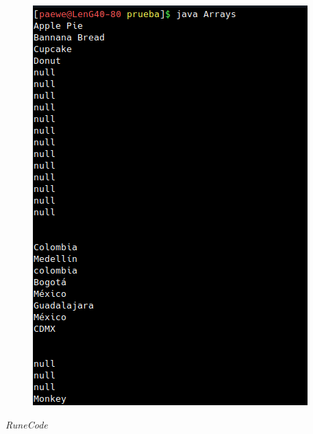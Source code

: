 \documentclass{article}
\begin{document}
\begin{figure}[h!]
  \centering
  \includegraphics[scale=0.75]{./Pictures/058_for_anidado.png}
\end{figure}


\vspace{2cm}
\LARGE\textit{RuneCode}
\end{document}

